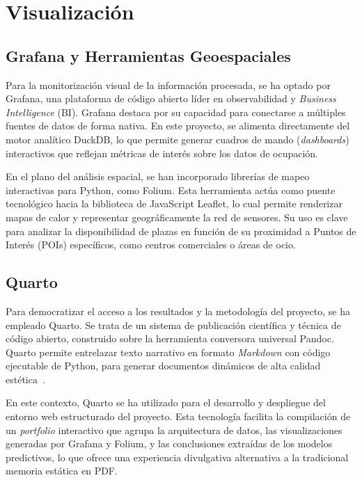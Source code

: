 \section{Visualización}
\label{sec:visualizacion}

\subsection{Grafana y Herramientas Geoespaciales}
\label{subsec:grafana_folium}

Para la monitorización visual de la información procesada, se ha optado por Grafana, una plataforma de código abierto líder en observabilidad y \textit{Business Intelligence} (BI). Grafana destaca por su capacidad para conectarse a múltiples fuentes de datos de forma nativa. En este proyecto, se alimenta directamente del motor analítico DuckDB, lo que permite generar cuadros de mando (\textit{dashboards}) interactivos que reflejan métricas de interés sobre los datos de ocupación.

En el plano del análisis espacial, se han incorporado librerías de mapeo interactivas para Python, como Folium. Esta herramienta actúa como puente tecnológico hacia la biblioteca de JavaScript Leaflet, lo cual permite renderizar mapas de calor y representar geográficamente la red de sensores. Su uso es clave para analizar la disponibilidad de plazas en función de su proximidad a Puntos de Interés (POIs) específicos, como centros comerciales o áreas de ocio.

\subsection{Quarto}
\label{subsec:quarto}

Para democratizar el acceso a los resultados y la metodología del proyecto, se ha empleado Quarto. Se trata de un sistema de publicación científica y técnica de código abierto, construido sobre la herramienta conversora universal Pandoc. Quarto permite entrelazar texto narrativo en formato \textit{Markdown} con código ejecutable de Python, para generar documentos dinámicos de alta calidad estética~\cite{Allaire2022quarto}.

En este contexto, Quarto se ha utilizado para el desarrollo y despliegue del entorno web estructurado del proyecto. Esta tecnología facilita la compilación de un \textit{portfolio} interactivo que agrupa la arquitectura de datos, las visualizaciones generadas por Grafana y Folium, y las conclusiones extraídas de los modelos predictivos, lo que ofrece una experiencia divulgativa alternativa a la tradicional memoria estática en PDF.